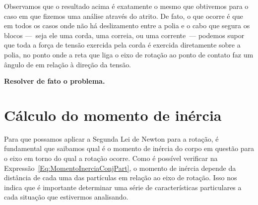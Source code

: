 Observamos que o resultado acima é exatamente o mesmo que obtivemos para o caso em que fizemos uma análise através do atrito. De fato, o que ocorre é que em todos os casos onde não há deslizamento entre a polia e o cabo que segura os blocos ---~seja ele uma corda, uma correia, ou uma corrente~--- podemos supor que toda a força de tensão exercida pela corda é exercida diretamente sobre a polia, no ponto onde a reta que liga o eixo de rotação ao ponto de contato faz um ângulo de  em relação à direção da tensão.

\textbf{Resolver de fato o problema.}

\section{Cálculo do momento de inércia}

Para que possamos aplicar a Segunda Lei de Newton para a rotação, é fundamental que saibamos qual é o momento de inércia do corpo em questão para o eixo em torno do qual a rotação ocorre. Como é possível verificar na Expressão~\ref{Eq:MomentoInerciaConjPart}, o momento de inércia depende da distância de cada uma das partículas em relação ao eixo de rotação. Isso nos indica que é importante determinar uma série de características particulares a cada situação que estivermos analisando.

